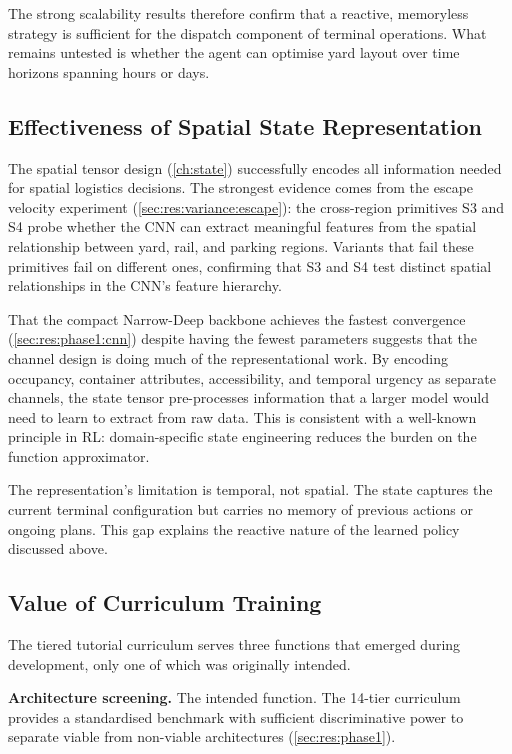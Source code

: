 The strong scalability results therefore confirm that a reactive, memoryless strategy is sufficient for the dispatch component of terminal operations. What remains untested is whether the agent can optimise yard layout over time horizons spanning hours or days.

\subsection{Effectiveness of Spatial State Representation}
\label{sec:disc:interpretation:spatial}

The spatial tensor design (\cref{ch:state}) successfully encodes all information needed for spatial logistics decisions. The strongest evidence comes from the escape velocity experiment (\cref{sec:res:variance:escape}): the cross-region primitives S3 and S4 probe whether the CNN can extract meaningful features from the spatial relationship between yard, rail, and parking regions. Variants that fail these primitives fail on different ones, confirming that S3 and S4 test distinct spatial relationships in the CNN's feature hierarchy.

That the compact Narrow-Deep backbone achieves the fastest convergence (\cref{sec:res:phase1:cnn}) despite having the fewest parameters suggests that the channel design is doing much of the representational work. By encoding occupancy, container attributes, accessibility, and temporal urgency as separate channels, the state tensor pre-processes information that a larger model would need to learn to extract from raw data. This is consistent with a well-known principle in RL: domain-specific state engineering reduces the burden on the function approximator.

The representation's limitation is temporal, not spatial. The state captures the current terminal configuration but carries no memory of previous actions or ongoing plans. This gap explains the reactive nature of the learned policy discussed above.

\subsection{Value of Curriculum Training}
\label{sec:disc:interpretation:curriculum}

The tiered tutorial curriculum serves three functions that emerged during development, only one of which was originally intended.

\textbf{Architecture screening.} The intended function. The 14-tier curriculum provides a standardised benchmark with sufficient discriminative power to separate viable from non-viable architectures (\cref{sec:res:phase1}).

